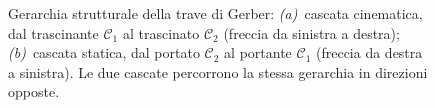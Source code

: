 \begin{figure}[ht]
		\caption{Gerarchia strutturale della trave di Gerber:
			\emph{(a)}~cascata cinematica, dal trascinante
			$\mathcal{C}_1$ al trascinato $\mathcal{C}_2$
			(freccia da sinistra a destra);
			\emph{(b)}~cascata statica, dal portato
			$\mathcal{C}_2$ al portante $\mathcal{C}_1$
			(freccia da destra a sinistra). Le due cascate
			percorrono la stessa gerarchia in direzioni
			opposte.}
		\label{fig:gerarchia}
	\end{figure}
